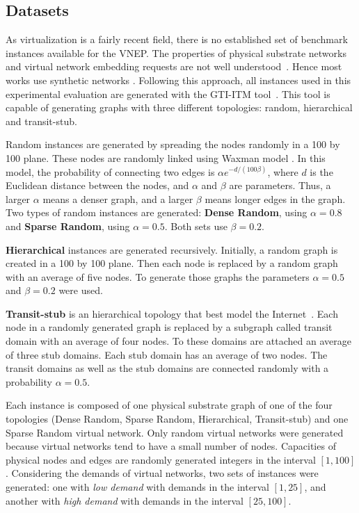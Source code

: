\documentclass[conference]{IEEEtran}
\begin{document}
\subsection{Datasets}

As virtualization is a fairly recent field, there is no established set of benchmark instances available for the VNEP\@.
The properties of physical substrate networks and virtual network embedding requests are not well understood~\cite{Chowdhury:2012}. Hence most works use synthetic networks \cite{FischerSurvey}.
Following this approach, all instances used in this experimental evaluation are generated with the GTI-ITM tool~\cite{Zagura:1996}.
This tool is capable of generating graphs with three different topologies: random, hierarchical and transit-stub.

Random instances are generated by spreading the nodes randomly in a 100 by 100 plane. These nodes are randomly linked using Waxman model \cite{Zagura:1996}. In this model, the probability of connecting two edges is $\alpha e^{- d / (100 \beta)}$, where $d$ is the Euclidean distance between the nodes, and $\alpha$ and $\beta$ are parameters. Thus, a larger $\alpha$ means a denser graph, and a larger $\beta$ means longer edges in the graph. Two types of random instances are generated: \textbf{Dense Random}, using $\alpha = 0.8$ and \textbf{Sparse Random}, using $\alpha = 0.5$. 
Both sets use $\beta = 0.2$.


\textbf{Hierarchical} instances are generated recursively. Initially, a random graph is created in a 100 by 100 plane. Then each node is replaced by a random graph with an average of five nodes. To generate those graphs the parameters $\alpha = 0.5$ and $\beta = 0.2$ were used.

\textbf{Transit-stub} is an hierarchical topology that best model the Internet~\cite{Zagura:1996}. Each node in a randomly generated graph is replaced by a subgraph called transit domain with an average of four nodes. To these domains are attached an average of three stub domains. Each stub domain has an average of two nodes. The transit domains as well as the stub domains are connected randomly with a probability $\alpha = 0.5$.

Each instance is composed of one physical substrate graph of one of the four topologies (Dense Random, Sparse Random, Hierarchical, Transit-stub) and one Sparse Random virtual network.  Only random virtual networks were generated because virtual networks tend to have a small number of nodes. Capacities of physical nodes and edges are randomly generated integers in the interval $[1,100]$. Considering the demands of virtual networks, two sets of instances were generated: one with \emph{low demand} with demands in the interval $[1,25]$, and another with \emph{high demand} with demands in the interval $[25,100]$.
\end{document}
